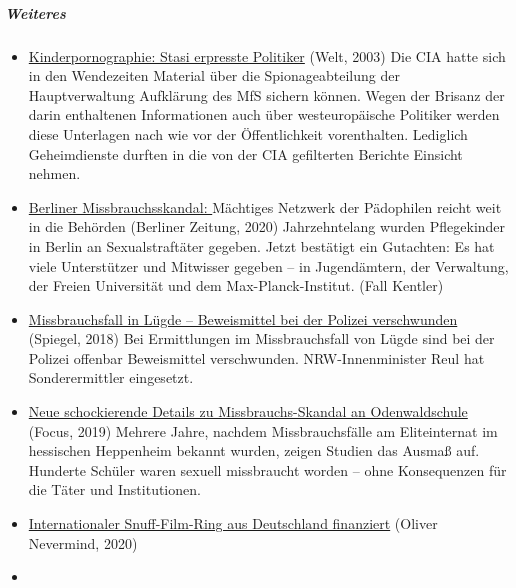\hypertarget{weiteres-1}{%
\subparagraph{\texorpdfstring{\textbf{Weiteres}}{Weiteres}}\label{weiteres-1}}

\begin{itemize}
\tightlist
\item
  \href{https://www.welt.de/print-welt/article378210/Kinderpornographie-Stasi-erpresste-Politiker.html}{Kinderpornographie:
  Stasi erpresste Politiker} (Welt, 2003) Die CIA hatte sich in den
  Wendezeiten Material über die Spionageabteilung der Hauptverwaltung
  Aufklärung des MfS sichern können. Wegen der Brisanz der darin
  enthaltenen Informationen auch über westeuropäische Politiker werden
  diese Unterlagen nach wie vor der Öffentlichkeit vorenthalten.
  Lediglich Geheimdienste durften in die von der CIA gefilterten
  Berichte Einsicht nehmen.
\item
  \href{https://www.berliner-zeitung.de/mensch-metropole/paedophile-missbrauch-berlin-pflegekinder-li.87610}{Berliner
  Missbrauchsskandal: }Mächtiges Netzwerk der Pädophilen reicht weit in
  die Behörden (Berliner Zeitung, 2020) Jahrzehntelang wurden
  Pflegekinder in Berlin an Sexualstraftäter gegeben. Jetzt bestätigt
  ein Gutachten: Es hat viele Unterstützer und Mitwisser gegeben -- in
  Jugendämtern, der Verwaltung, der Freien Universität und dem
  Max-Planck-Institut. (Fall Kentler)\\
\item
  \href{http://www.spiegel.de/panorama/justiz/luegde-beweismittel-bei-der-polizei-verschwunden-a-1254495.html}{Missbrauchsfall
  in Lügde -- Beweismittel bei der Polizei verschwunden} (Spiegel, 2018)
  Bei Ermittlungen im Missbrauchsfall von Lügde sind bei der Polizei
  offenbar Beweismittel verschwunden. NRW-Innenminister Reul hat
  Sonderermittler eingesetzt.
\item
  \href{https://www.focus.de/panorama/welt/eliteinternat-neue-schockierende-details-zu-missbrauchs-skandal-an-odenwaldschule_id_10363633.html}{Neue
  schockierende Details zu Missbrauchs-Skandal an Odenwaldschule}
  (Focus, 2019) Mehrere Jahre, nachdem Missbrauchsfälle am Eliteinternat
  im hessischen Heppenheim bekannt wurden, zeigen Studien das Ausmaß
  auf. Hunderte Schüler waren sexuell missbraucht worden -- ohne
  Konsequenzen für die Täter und Institutionen.
\item
  \href{https://olivernevermind.wordpress.com/2020/06/29/internationaler-snuff-film-ring-aus-deutschland-finanziert/}{Internationaler
  Snuff-Film-Ring aus Deutschland finanziert} (Oliver Nevermind, 2020)
\item

\end{itemize}
